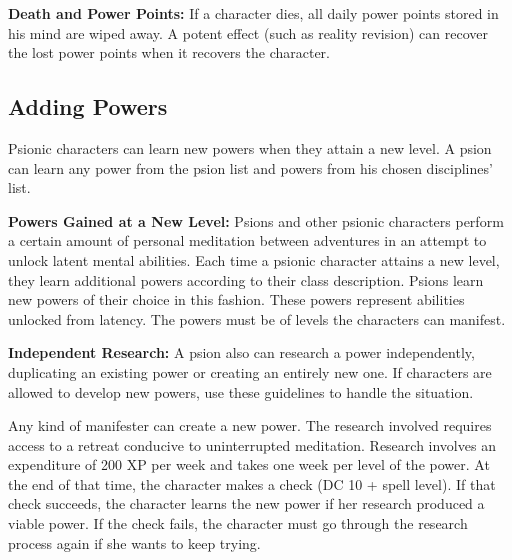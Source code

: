 \textbf{Death and Power Points:} If a character dies, all daily power points stored in his mind are wiped away. A potent effect (such as reality revision) can recover the lost power points when it recovers the character.

\subsection{Adding Powers}
Psionic characters can learn new powers when they attain a new level. A psion can learn any power from the psion list and powers from his chosen disciplines' list. %

\textbf{Powers Gained at a New Level:} Psions and other psionic characters perform a certain amount of personal meditation between adventures in an attempt to unlock latent mental abilities. Each time a psionic character attains a new level, they learn additional powers according to their class description. Psions learn new powers of their choice in this fashion. These powers represent abilities unlocked from latency. The powers must be of levels the characters can manifest.

\textbf{Independent Research:} A psion also can research a power independently, duplicating an existing power or creating an entirely new one. If characters are allowed to develop new powers, use these guidelines to handle the situation.

Any kind of manifester can create a new power. The research involved requires access to a retreat conducive to uninterrupted meditation. Research involves an expenditure of 200 XP per week and takes one week per level of the power. At the end of that time, the character makes a  check (DC 10 + spell level). If that check succeeds, the character learns the new power if her research produced a viable power. If the check fails, the character must go through the research process again if she wants to keep trying.


